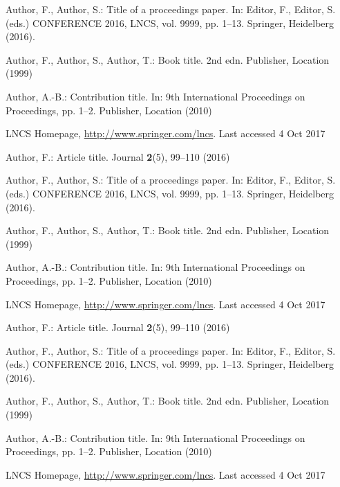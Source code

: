 \documentclass[runningheads]{llncs}
\begin{document}
\begin{thebibliography}{8}
Author, F., Author, S.: Title of a proceedings paper. In: Editor,
F., Editor, S. (eds.) CONFERENCE 2016, LNCS, vol. 9999, pp. 1--13.
Springer, Heidelberg (2016). 

Author, F., Author, S., Author, T.: Book title. 2nd edn. Publisher,
Location (1999)

Author, A.-B.: Contribution title. In: 9th International Proceedings
on Proceedings, pp. 1--2. Publisher, Location (2010)

LNCS Homepage, \url{http://www.springer.com/lncs}. Last accessed 4
Oct 2017

Author, F.: Article title. Journal \textbf{2}(5), 99--110 (2016)

Author, F., Author, S.: Title of a proceedings paper. In: Editor,
F., Editor, S. (eds.) CONFERENCE 2016, LNCS, vol. 9999, pp. 1--13.
Springer, Heidelberg (2016). 

Author, F., Author, S., Author, T.: Book title. 2nd edn. Publisher,
Location (1999)

Author, A.-B.: Contribution title. In: 9th International Proceedings
on Proceedings, pp. 1--2. Publisher, Location (2010)

LNCS Homepage, \url{http://www.springer.com/lncs}. Last accessed 4
Oct 2017

Author, F.: Article title. Journal \textbf{2}(5), 99--110 (2016)

Author, F., Author, S.: Title of a proceedings paper. In: Editor,
F., Editor, S. (eds.) CONFERENCE 2016, LNCS, vol. 9999, pp. 1--13.
Springer, Heidelberg (2016). 

Author, F., Author, S., Author, T.: Book title. 2nd edn. Publisher,
Location (1999)

Author, A.-B.: Contribution title. In: 9th International Proceedings
on Proceedings, pp. 1--2. Publisher, Location (2010)

LNCS Homepage, \url{http://www.springer.com/lncs}. Last accessed 4
Oct 2017
\end{thebibliography}
\end{document}
